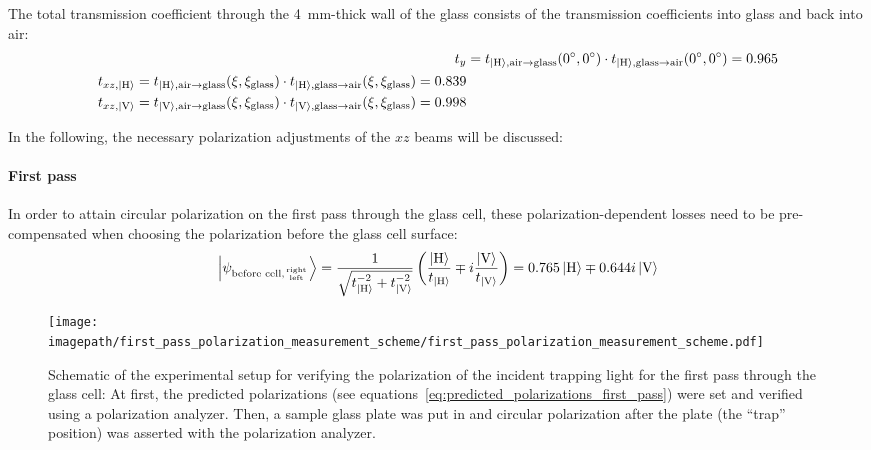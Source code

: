 The total transmission coefficient through the \SI{4}{\milli\meter}-thick wall of the glass consists of the transmission coefficients into glass and back into air:
\begin{align}
    t_{y} &= t_{\Ket{\text{H}}, \text{air} \rightarrow \text{glass}}(\SI{0}{\degree}, \SI{0}{\degree})  \cdot t_{\Ket{\text{H}}, \text{glass} \rightarrow \text{air}}(\SI{0}{\degree}, \SI{0}{\degree}) = \SI{0.965}{} \\
    \begin{split}
        t_{xz, \Ket{\text{H}}} &= t_{\Ket{\text{H}}, \text{air} \rightarrow \text{glass}}(\xi, \xi_\text{glass})  \cdot t_{\Ket{\text{H}}, \text{glass} \rightarrow \text{air}}(\xi, \xi_\text{glass}) = \SI{0.839}{} \\
        t_{xz, \Ket{\text{V}}} &= t_{\Ket{\text{V}}, \text{air} \rightarrow \text{glass}}(\xi, \xi_\text{glass})  \cdot t_{\Ket{\text{V}}, \text{glass} \rightarrow \text{air}}(\xi, \xi_\text{glass}) = \SI{0.998}{}
    \end{split}
\end{align}

In the following, the necessary polarization adjustments of the $xz$ beams will be discussed:

\paragraph{First pass}
In order to attain circular polarization on the first pass through the glass cell, these polarization-dependent losses need to be pre-compensated when choosing the polarization before the glass cell surface:
\begin{align}
    \label{eq:predicted_polarizations_first_pass}
    \Ket{\psi_{\text{before cell,} {\text{right} \atop \text{left}}}} 
    = \frac{1}{\sqrt{t_{\Ket{\text{H}}}^{-2} + t_{\Ket{\text{V}}}^{-2}}}
        \left(\frac{\Ket{\text{H}}}{t_{\Ket{\text{H}}}} \mp i \frac{\Ket{\text{V}}}{t_{\Ket{\text{V}}}} \right)
    = 0.765 \Ket{\text{H}} \mp 0.644i \Ket{\text{V}}
\end{align}

\begin{figure}
    \centering
    \texttt{[image: \\imagepath/first\_pass\_polarization\_measurement\_scheme/first\_pass\_polarization\_measurement\_scheme.pdf]}
    \caption{Schematic of the experimental setup for verifying the polarization of the incident trapping light for the first pass through the glass cell: At first, the predicted polarizations (see equations~\ref{eq:predicted_polarizations_first_pass}) were set and verified using a polarization analyzer. Then, a sample glass plate was put in and circular polarization after the plate (the ``trap'' position) was asserted with the polarization analyzer.}
    \label{fig:first_pass_polarization_measurement_scheme}
\end{figure}

